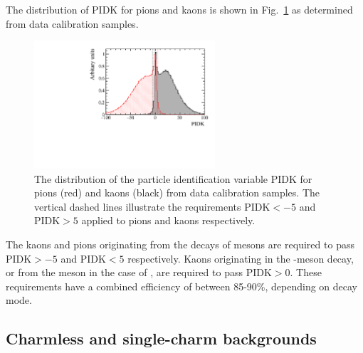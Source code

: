 The distribution of PIDK for pions and kaons is shown in Fig.~\ref{fig:selection_PIDK_distribution} as determined from data calibration samples.
\begin{figure}[!h]
    \centering
        \includegraphics[width=0.6\textwidth]{figs/Selection/Calib_sample_PIDK.pdf}
        \caption{The distribution of the particle identification variable PIDK for pions (red) and kaons (black) from data calibration samples. The vertical dashed lines illustrate the requirements $\text{PIDK}<-5$ and $\text{PIDK}>5$ applied to pions and kaons respectively.}
    \label{fig:selection_PIDK_distribution}   
\end{figure}

The kaons and pions originating from the decays of \Dsp mesons are required to pass $\text{PIDK} > -5$ and $\text{PIDK} < 5$ respectively. Kaons originating in the \phiz-meson decay, or from the \Bp meson in the case of \decay{\Bp}{\Dsp\Kp\Km}, are required to pass $\text{PIDK} > 0$. These requirements have a combined efficiency of between 85-90\%, depending on \Dsp decay mode. 



\subsection{Charmless and single-charm backgrounds}


